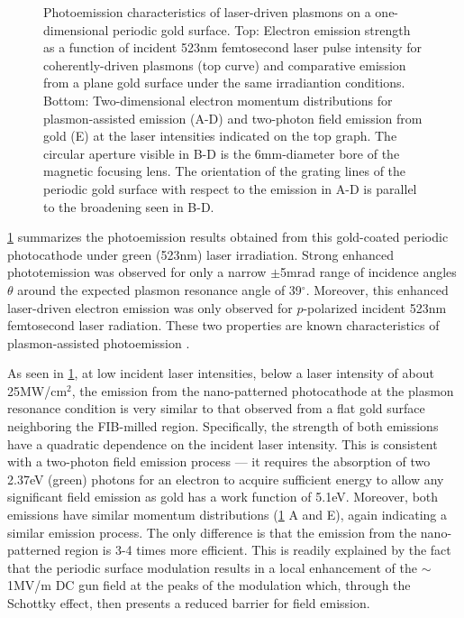 \begin{figure}
  \centering
  
  \caption[Photoemission characteristics of laser-driven plasmons on a one-dimensional periodic gold surface]{
    Photoemission characteristics of laser-driven plasmons on a one-dimensional periodic gold surface.
    Top: Electron emission strength as a function of incident 523nm femtosecond laser pulse intensity for coherently-driven plasmons (top curve)
      and comparative emission from a plane gold surface under the same irradiantion conditions.
    Bottom: Two-dimensional electron momentum distributions for plasmon-assisted emission (A-D) and two-photon field emission from gold (E) at the laser intensities indicated on the top graph.
    The circular aperture visible in B-D is the 6mm-diameter bore of the magnetic focusing lens.
    The orientation of the grating lines of the periodic gold surface with respect to the emission in A-D is parallel to the broadening seen in B-D.
  }
  \label{fig:pape}
\end{figure}

\ref{fig:pape} summarizes the photoemission results obtained from this gold-coated periodic photocathode under green (523nm) laser irradiation.
Strong enhanced phototemission was observed for only a narrow $\pm$5mrad range of incidence angles $\theta$ around the expected plasmon resonance angle of 39$^{\circ}$.
Moreover, this enhanced laser-driven electron emission was only observed for $p$-polarized incident 523nm femtosecond laser radiation.
These two properties are known characteristics of plasmon-assisted photoemission \cite{kupersztych_ponderomotive_2001,kupersztych_anomalous_2005,li_surface_2013}.

As seen in \ref{fig:pape}, at low incident laser intensities, below a laser intensity of about 25MW/cm$^2$, the emission from the nano-patterned photocathode at the plasmon resonance condition is very similar to that observed from a flat gold surface neighboring the FIB-milled region.
Specifically, the strength of both emissions have a quadratic dependence on the incident laser intensity.
This is consistent with a two-photon field emission process --- it requires the absorption of two 2.37eV (green) photons for an electron to acquire sufficient energy to allow any significant field emission as gold has a work function of 5.1eV.
Moreover, both emissions have similar momentum distributions (\ref{fig:pape} A and E), again indicating a similar emission process.
The only difference is that the emission from the nano-patterned region is 3-4 times more efficient.
This is readily explained by the fact that the periodic surface modulation results in a local enhancement of the $\sim$1MV/m DC gun field at the peaks of the modulation which, through the Schottky effect, then presents a reduced barrier for field emission.

